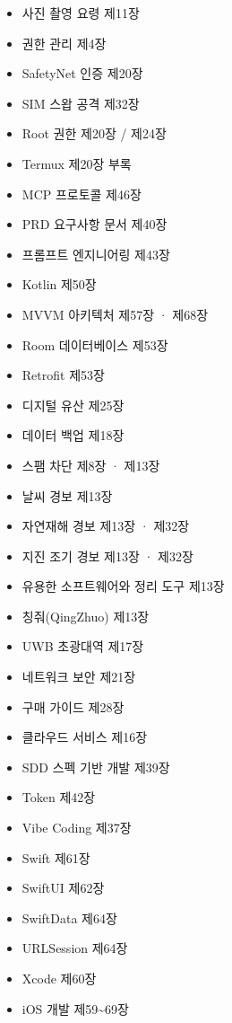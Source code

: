 
\begin{itemize}
  \item 사진 촬영 요령 제11장
  \item 권한 관리 제4장
  \item SafetyNet 인증 제20장
  \item SIM 스왑 공격 제32장
  \item Root 권한 제20장 / 제24장
  \item Termux 제20장 부록
  \item MCP 프로토콜 제46장
  \item PRD 요구사항 문서 제40장
  \item 프롬프트 엔지니어링 제43장
  \item Kotlin 제50장
  \item MVVM 아키텍처 제57장 · 제68장
  \item Room 데이터베이스 제53장
  \item Retrofit 제53장
\end{itemize}


\begin{itemize}
  \item 디지털 유산 제25장
  \item 데이터 백업 제18장
  \item 스팸 차단 제8장 · 제13장
  \item 날씨 경보 제13장
  \item 자연재해 경보 제13장 · 제32장
  \item 지진 조기 경보 제13장 · 제32장
  \item 유용한 소프트웨어와 정리 도구 제13장
  \item 칭줘(QingZhuo) 제13장
  \item UWB 초광대역 제17장
  \item 네트워크 보안 제21장
  \item 구매 가이드 제28장
  \item 클라우드 서비스 제16장
  \item SDD 스펙 기반 개발 제39장
  \item Token 제42장
  \item Vibe Coding 제37장
  \item Swift 제61장
  \item SwiftUI 제62장
  \item SwiftData 제64장
  \item URLSession 제64장
  \item Xcode 제60장
  \item iOS 개발 제59\textasciitilde{}69장
\end{itemize}

